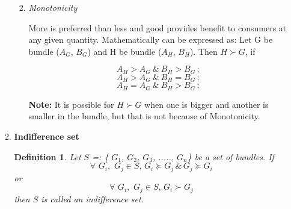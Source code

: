 \documentclass[10pt]{article}
\newenvironment{changemargin}[2]{%
  \begin{list}{}{%
    \setlength{\topsep}{0pt}%
    \setlength{\leftmargin}{#1}%
    \setlength{\rightmargin}{#2}%
    \setlength{\listparindent}{\parindent}%
    \setlength{\itemindent}{\parindent}%
    \setlength{\parsep}{\parskip}%
  }%
  \item[]}{\end{list}}
\begin{document}
\begin{changemargin}{-0.125in}{0in}
\begin{enumerate}
\begin{enumerate}
\begin{enumerate}
                \smallskip
                
                \item \textit{Monotonicity}
                
                \smallskip
                
                More is preferred than less and good provides benefit to consumers at any given quantity. Mathematically can be expressed as: Let G be bundle ($A_G$, $B_G$) and H be bundle ($A_H$, $B_H$). Then $H \succ G$, if 
                
                    \[
                      A_H > A_G \:\&\: B_H > B_G\,;
                    \]
                    \[
                      A_H > A_G \:\&\: B_H = B_G\,;
                    \]
                    \[
                      A_H = A_G \:\&\: B_H > B_G\,;
                    \]
                
                \smallskip
                
                \textbf{Note:} It is possible for $H \succ G$ when one is bigger and another is smaller in the bundle, but that is not because of Monotonicity. 
                   
                    \begin{center}

                    \end{center} 
                
                        
          \end{enumerate}
          
          \smallskip
          
          \item \textbf{Indifference set}
          
          \newtheorem{definition}{Definition}[section]
          
          \smallskip
          
          \begin{definition}
          	Let $S$ =: \{ $G_1$, $G_2$, $G_3$, ....., $G_n$\} be a set of bundles. If 
          	\[
          	\forall \,\, G_i,\, \,G_j \in S,\, G_i \succeq G_j \,\& \, G_j \succeq G_i
          	\]
          	or 
          	\[
          	\forall \,\, G_i,\, \,G_j \in S, \, G_i \succ G_j
          	\]
          	then $S$ is called an indifference set.          	
          \end{definition}
          
          \smallskip
          

\end{enumerate}
\end{enumerate}
\end{changemargin}
\end{document}

